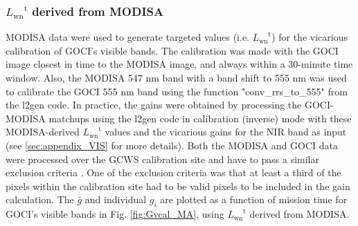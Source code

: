 \documentclass[]{interact}
\theoremstyle{plain}%
\theoremstyle{definition}
\theoremstyle{remark}
\begin{document}
\subsubsection{${L_\text{wn}}^\text{t}$ derived from MODISA}

MODISA data were used to generate targeted values (i.e. ${L_\text{wn}}^\text{t}$) for the vicarious calibration of GOCI's visible bands. The calibration was made with the GOCI image closest in time to the MODISA image, and always within a 30-minute time window. Also, the MODISA 547 nm band with a band shift to 555 nm was used to calibrate the GOCI 555 nm band using the function "conv\_rrs\_to\_555" from the l2gen code. In practice, the gains were obtained by processing the GOCI-MODISA matchups using the l2gen code in calibration (inverse) mode with these MODISA-derived ${L_\text{wn}}^\text{t}$ values and the vicarious gains for the NIR band as input (see \autoref{sec:appendix_VIS} for more details). Both the MODISA and GOCI data were processed over the GCWS calibration site and have to pass a similar exclusion criteria \citep{Bailey2006}. One of the exclusion criteria was that at least a third of the pixels within the calibration site had to be valid pixels to be included in the gain calculation. The $\bar{g}$ and individual $g_i$ are plotted as a function of mission time for GOCI's visible bands in Fig. \ref{fig:Gvcal_MA}, using ${L_\text{wn}}^\text{t}$ derived from MODISA. 

\end{document}
